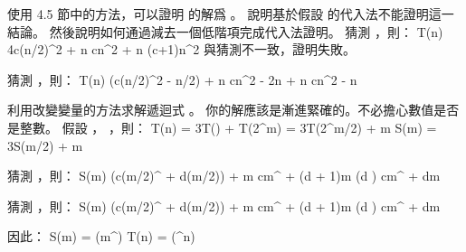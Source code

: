 \startEXERCISE
使用 4.5 節中的方法，可以證明  的解爲 。
說明基於假設  的代入法不能證明這一結論。
然後說明如何通過減去一個低階項完成代入法證明。
\stopEXERCISE
\startANSWER
猜測 ，則：
\startformula\startmathalignment
\NC T(n) \NC \le 4c(n/2)^2 + n \NR
\NC      \NC \le cn^2 + n \NR
\NC      \NC \le (c+1)n^2 \NR
\stopmathalignment\stopformula
與猜測不一致，證明失敗。

猜測 ，則：
\startformula\startmathalignment
\NC T(n) \NC {}\Big(c(n/2)^2 - n/2\Big) + n \NR
\NC      \NC \le cn^2 - 2n + n \NR
\NC      \NC \le cn^2 - n \NR
\stopmathalignment\stopformula
\stopANSWER

\startEXERCISE
利用改變變量的方法求解遞迴式 。
你的解應該是漸進緊確的。不必擔心數值是否是整數。
\stopEXERCISE
\startANSWER
假設 ， ，則：
\startformula\startmathalignment
\NC T(n)   \NC = 3T() +  \NR
\NC T(2^m) \NC = 3T(2^{m/2}) + m \NR
\NC S(m)   \NC = 3S(m/2) + m \NR
\stopmathalignment\stopformula

猜測 ，則：
\startformula\startmathalignment[n=3]
\NC S(m) \NC {}\Big(c(m/2)^{} + d(m/2)\Big) + m \NC \NR
\NC      \NC \le cm^{} + (d + 1)m       \NC (d ) \NR
\NC      \NC \le cm^{} + dm \NC \NR
\stopmathalignment\stopformula

猜測 ，則：
\startformula\startmathalignment[n=3]
\NC S(m) \NC {}\Big(c(m/2)^{} + d(m/2)\Big) + m \NC \NR
\NC      \NC \ge cm^{} + (d + 1)m       \NC (d ) \NR
\NC      \NC \ge cm^{} + dm \NC \NR
\stopmathalignment\stopformula

因此：
\startformula\startmathalignment
\NC S(m) \NC = \Theta(m^{}) \NR
\NC T(n) \NC = \Theta(\lg^{}{n}) \NR
\stopmathalignment\stopformula
\stopANSWER

\stopsection
